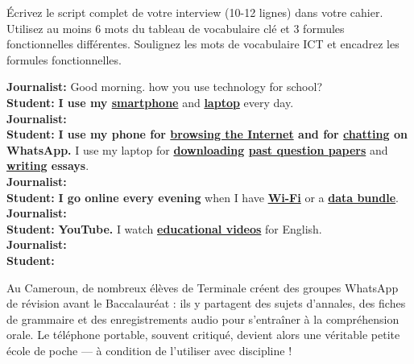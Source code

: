 \documentclass[11pt]{article}
\begin{document}
\begin{exercice}
Écrivez le script complet de votre interview (10-12 lignes) dans votre cahier. Utilisez au moins 6 mots du tableau de vocabulaire clé et 3 formules fonctionnelles différentes. Soulignez les mots de vocabulaire ICT et encadrez les formules fonctionnelles.
\end{exercice}

\begin{corrige}
\textbf{Journalist:} Good morning.  how you use technology for school? \\
\textbf{Student:}  \textbf{I use my \underline{smartphone}} and \textbf{\underline{laptop}} every day. \\
\textbf{Journalist:}  \\
\textbf{Student:} \textbf{I use my phone for \underline{browsing the Internet} and for \underline{chatting} on WhatsApp.} I use my laptop for \textbf{\underline{downloading} \underline{past question papers}} and \textbf{\underline{writing} essays}. \\
\textbf{Journalist:}   \\
\textbf{Student:} \textbf{I go online every evening} when I have \textbf{\underline{Wi-Fi}} or a \textbf{\underline{data bundle}}. \\
\textbf{Journalist:}  \\
\textbf{Student:} \textbf{YouTube.} I watch \textbf{\underline{educational videos}} for English.  \\
\textbf{Journalist:}  \\
\textbf{Student:} 
\end{corrige}

\begin{savaistu}
Au Cameroun, de nombreux élèves de Terminale créent des groupes WhatsApp de révision avant le Baccalauréat : ils y partagent des sujets d'annales, des fiches de grammaire et des enregistrements audio pour s'entraîner à la compréhension orale. Le téléphone portable, souvent critiqué, devient alors une véritable petite école de poche — à condition de l'utiliser avec discipline !
\end{savaistu}
\end{document}
